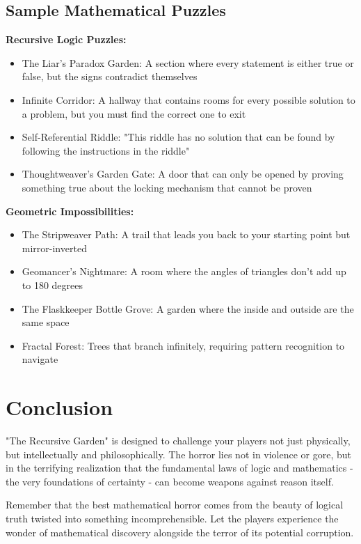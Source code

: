\documentclass[11pt]{article}
\begin{document}
\subsection{Sample Mathematical Puzzles}

\textbf{Recursive Logic Puzzles:}
\begin{itemize}
\item The Liar's Paradox Garden: A section where every statement is either true or false, but the signs contradict themselves
\item Infinite Corridor: A hallway that contains rooms for every possible solution to a problem, but you must find the correct one to exit
\item Self-Referential Riddle: "This riddle has no solution that can be found by following the instructions in the riddle"
\item Thoughtweaver's Garden Gate: A door that can only be opened by proving something true about the locking mechanism that cannot be proven
\end{itemize}

\textbf{Geometric Impossibilities:}
\begin{itemize}
\item The Stripweaver Path: A trail that leads you back to your starting point but mirror-inverted
\item Geomancer's Nightmare: A room where the angles of triangles don't add up to 180 degrees
\item The Flaskkeeper Bottle Grove: A garden where the inside and outside are the same space
\item Fractal Forest: Trees that branch infinitely, requiring pattern recognition to navigate
\end{itemize}

\section{Conclusion}

"The Recursive Garden" is designed to challenge your players not just physically, but intellectually and philosophically. The horror lies not in violence or gore, but in the terrifying realization that the fundamental laws of logic and mathematics - the very foundations of certainty - can become weapons against reason itself.

Remember that the best mathematical horror comes from the beauty of logical truth twisted into something incomprehensible. Let the players experience the wonder of mathematical discovery alongside the terror of its potential corruption.
\end{document}
